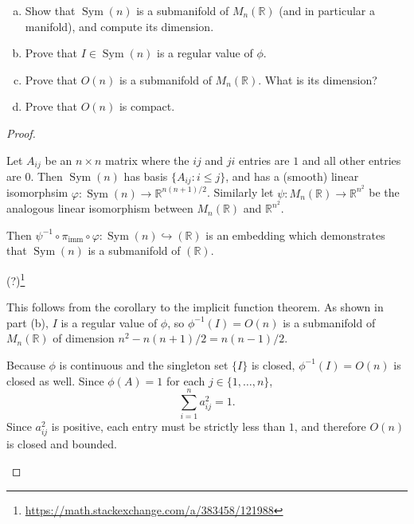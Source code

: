\documentclass{article}
\newenvironment{problem}[2][Problem]{\begin{trivlist}
\item[\hskip \labelsep {\bfseries #1}\hskip \labelsep {\bfseries #2.}]}{\end{trivlist}}
\newenvironment{problempart}[1]{\begin{trivlist}\item[\textbf{Part #1.}]}{\end{trivlist}}
\begin{document}
\pagebreak

\begin{problem}{6} $ $\\
  \begin{enumerate}[(a)]
    \item Show that $\operatorname{Sym}(n)$ is a submanifold of
    $M_n(\mathbb{R})$ (and in particular a manifold), and compute its dimension.
    \item Prove that $I \in \operatorname{Sym}(n)$ is a regular value of $\phi$.
    \item Prove that $O(n)$ is a submanifold of $M_n(\mathbb{R})$. What is its dimension?
    \item Prove that $O(n)$ is compact.
  \end{enumerate}
\end{problem}

\begin{proof} \text{\\}
  \begin{problempart}{(a)}
    Let $A_{ij}$ be an $n\times n$ matrix where the $ij$ and $ji$ entries are $1$
    and all other entries are $0$. Then $\operatorname{Sym}(n)$ has basis
    $\{A_{ij} : i \leq j\}$, and has a (smooth) linear isomorphsim
    $\varphi:\operatorname{Sym}(n) \rightarrow \mathbb{R}^{n(n+1)/2}$. Similarly
    let $\psi: M_n(\mathbb{R}) \rightarrow \mathbb{R}^{n^2}$ be the analogous
    linear isomorphism between $ M_n(\mathbb{R})$ and $\mathbb{R}^{n^2}$.

    Then $\psi^{-1} \circ \pi_\text{imm} \circ \varphi: \operatorname{Sym}(n) \hookrightarrow (\mathbb{R})$
    is an embedding which demonstrates that $\operatorname{Sym}(n)$ is a submanifold of $(\mathbb{R})$.
  \end{problempart}
  \begin{problempart}{(b)}
    (?)\footnote{\url{https://math.stackexchange.com/a/383458/121988}}
  \end{problempart}
  \begin{problempart}{(c)}
    This follows from the corollary to the implicit function theorem. As shown in
    part (b), $I$ is a regular value of $\phi$, so $\phi^{-1}(I) = O(n)$ is a
    submanifold of $M_n(\mathbb{R})$ of dimension $n^2 - n(n+1)/2 = n(n-1)/2$.
  \end{problempart}
  \begin{problempart}{(d)}
    Because $\phi$ is continuous and the singleton set $\{ I \}$ is closed,
    $\phi^{-1}(I) = O(n)$ is closed as well.
    Since $\phi(A) = 1$ for each $j \in \{ 1,\hdots,n\}$, \[
      \sum_{i=1}^{n} a_{ij}^2 = 1.
    \]
    Since $a_{ij}^2$ is positive, each entry must be strictly less than $1$, and
    therefore $O(n)$ is closed and bounded.
  \end{problempart}
\end{proof}
\end{document}
